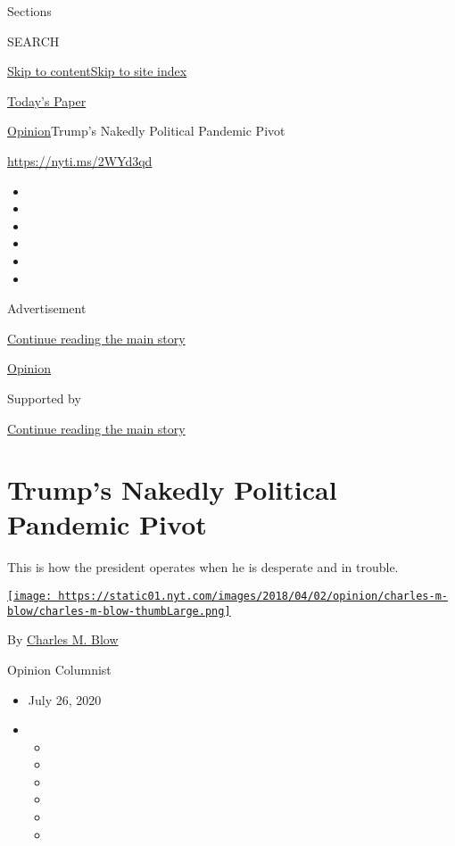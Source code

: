 Sections

SEARCH

\protect\hyperlink{site-content}{Skip to
content}\protect\hyperlink{site-index}{Skip to site index}

\href{https://myaccount.nytimes.com/auth/login?response_type=cookie\&client_id=vi}{}

\href{https://www.nytimes.com/section/todayspaper}{Today's Paper}

\href{/section/opinion}{Opinion}\textbar{}Trump's Nakedly Political
Pandemic Pivot

\url{https://nyti.ms/2WYd3qd}

\begin{itemize}
\item
\item
\item
\item
\item
\item
\end{itemize}

Advertisement

\protect\hyperlink{after-top}{Continue reading the main story}

\href{/section/opinion}{Opinion}

Supported by

\protect\hyperlink{after-sponsor}{Continue reading the main story}

\hypertarget{trumps-nakedly-political-pandemic-pivot}{%
\section{Trump's Nakedly Political Pandemic
Pivot}\label{trumps-nakedly-political-pandemic-pivot}}

This is how the president operates when he is desperate and in trouble.

\href{https://www.nytimes.com/by/charles-m-blow}{\texttt{[image: https://static01.nyt.com/images/2018/04/02/opinion/charles-m-blow/charles-m-blow-thumbLarge.png]}}

By \href{https://www.nytimes.com/by/charles-m-blow}{Charles M. Blow}

Opinion Columnist

\begin{itemize}
\item
  July 26, 2020
\item
  \begin{itemize}
  \item
  \item
  \item
  \item
  \item
  \item
  \end{itemize}
\end{itemize}

